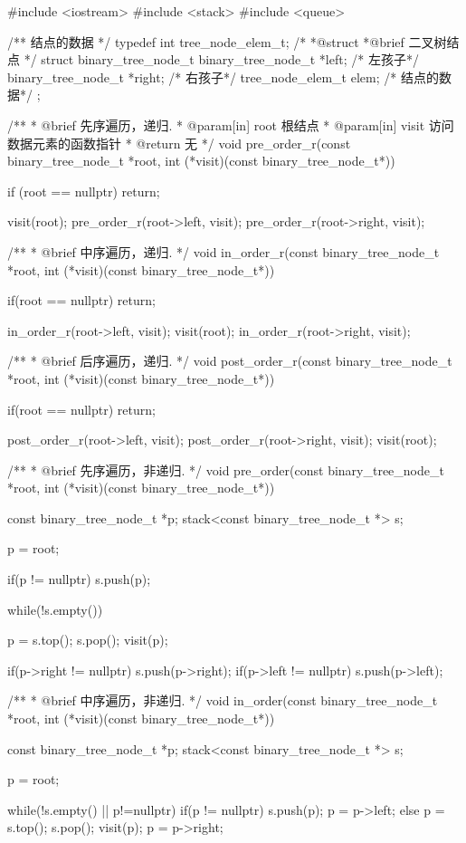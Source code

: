 \begin{Codex}[label=binary_tree.cpp]
#include <iostream>
#include <stack>
#include <queue>

/** 结点的数据 */
typedef int tree_node_elem_t;
 /*
  *@struct
  *@brief 二叉树结点
  */
struct binary_tree_node_t {
    binary_tree_node_t *left;   /* 左孩子*/
    binary_tree_node_t *right;   /* 右孩子*/
    tree_node_elem_t elem; /* 结点的数据*/
};

/**
  * @brief 先序遍历，递归.
  * @param[in] root 根结点
  * @param[in] visit 访问数据元素的函数指针
  * @return 无
  */
void pre_order_r(const binary_tree_node_t *root,
                 int (*visit)(const binary_tree_node_t*)) {
    if (root == nullptr) return;

    visit(root);
    pre_order_r(root->left, visit);
    pre_order_r(root->right, visit);
}

/**
  * @brief 中序遍历，递归.
  */
void in_order_r(const binary_tree_node_t *root,
                int (*visit)(const binary_tree_node_t*)) {
    if(root == nullptr) return;

    in_order_r(root->left, visit);
    visit(root);
    in_order_r(root->right, visit);
}

/**
  * @brief 后序遍历，递归.
  */
void post_order_r(const binary_tree_node_t *root,
                  int (*visit)(const binary_tree_node_t*)) {
    if(root == nullptr) return;

    post_order_r(root->left, visit);
    post_order_r(root->right, visit);
    visit(root);
}

/**
 * @brief 先序遍历，非递归.
 */
void pre_order(const binary_tree_node_t *root,
               int (*visit)(const binary_tree_node_t*)) {
    const binary_tree_node_t *p;
    stack<const binary_tree_node_t *> s;

    p = root;

    if(p != nullptr) s.push(p);

    while(!s.empty()) {
        p = s.top();
        s.pop();
        visit(p);

        if(p->right != nullptr) s.push(p->right);
        if(p->left != nullptr) s.push(p->left);
    }
}

/**
 * @brief 中序遍历，非递归.
 */
void in_order(const binary_tree_node_t *root,
              int (*visit)(const binary_tree_node_t*)) {
    const binary_tree_node_t *p;
    stack<const binary_tree_node_t *> s;

    p = root;

    while(!s.empty() || p!=nullptr) {
        if(p != nullptr) {
            s.push(p);
            p = p->left;
        } else {
            p = s.top();
            s.pop();
            visit(p);
            p = p->right;
        }
    }
}


\end{Codex}
